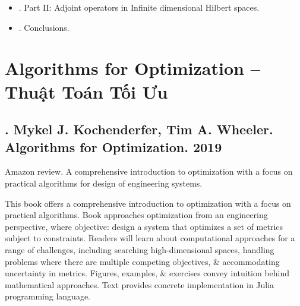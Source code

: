\documentclass{article}
\newtheorem{theorem}{Theorem}
\begin{document}
\begin{enumerate}
\begin{itemize}
		\item {. Part II: Adjoint operators in Infinite dimensional Hilbert spaces.}
		\item {. Conclusions.}
	\end{itemize}
\end{enumerate}


\section{Algorithms for Optimization -- Thuật Toán Tối Ưu}

\subsection{\cite{Kochenderfer_Wheeler2019}. {\sc Mykel J. Kochenderfer, Tim A. Wheeler}. Algorithms for Optimization. 2019}
{}

{\sf Amazon review.} A comprehensive introduction to optimization with a focus on practical algorithms for design of engineering systems.

This book offers a comprehensive introduction to optimization with a focus on practical algorithms. Book approaches optimization from an engineering perspective, where objective: design a system that optimizes a set of metrics subject to constraints. Readers will learn about computational approaches for a range of challenges, including searching high-dimensional spaces, handling problems where there are multiple competing objectives, \& accommodating uncertainty in metrics. Figures, examples, \& exercises convey intuition behind mathematical approaches. Text provides concrete implementation in Julia programming language.
\end{document}
